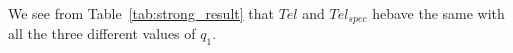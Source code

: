 \documentclass[a4paper,runningheads]{llncs}
\begin{document}
We see from  Table~\ref{tab:strong_result} that $Tel$ and $Tel_{spec}$ hebave the same with all the three different values of $q_1$.
\end{document}
